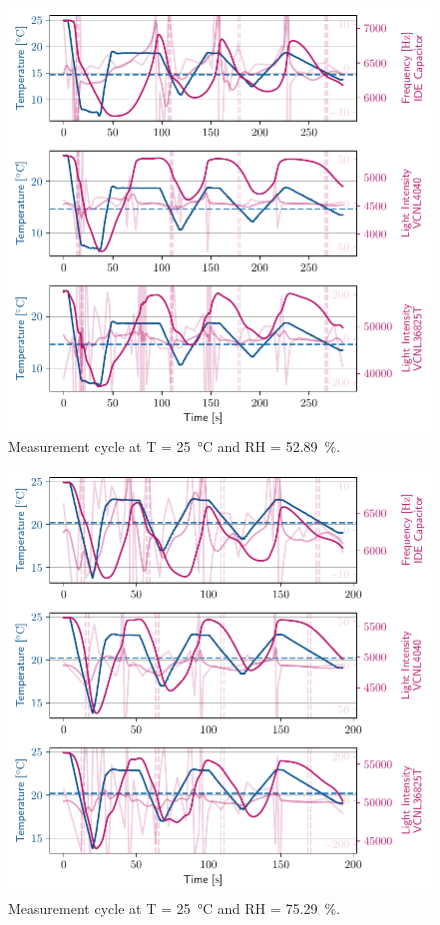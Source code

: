 \begin{figure}[ht]
    \centering
    \includegraphics{graphs/t25rh52.9.pdf}
    \caption{Measurement cycle at T = \qty{25}{\celsius} and RH = \qty{52.89}{\percent}.}
    
\end{figure}

\begin{figure}[ht]
    \centering
    \includegraphics{graphs/t25rh75.pdf}
    \caption{Measurement cycle at T = \qty{25}{\celsius} and RH = \qty{75.29}{\percent}.}
    
\end{figure}

